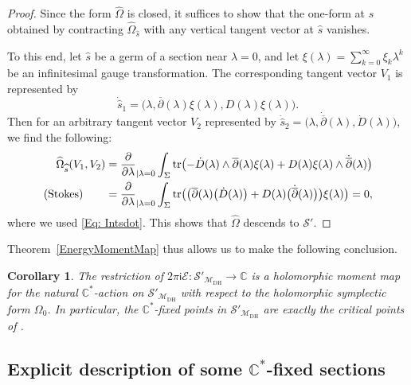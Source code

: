 \documentclass[pdftex]{sigma}
\numberwithin{equation}{section}
\newtheorem{Corollary}[Theorem]{Corollary}
\theoremstyle{definition}
\newcommand\C{{\mathbb C}}
\renewcommand{\i}{\mathsf{i}}
\begin{document}
\begin{proof}
Since the form $\widehat{\Omega}$ is closed, it suffices to show that the one-form at $\widehat s$ obtained by
contracting $\widehat{\Omega}_{\widehat{s}}$ with any vertical tangent vector at $\widehat{s}$ vanishes.

To this end, let $\widehat{s}$ be a germ of a section near $\lambda = 0$, and
let $\xi(\lambda) = \sum_{k=0}^\infty\xi_k\lambda^k$ be an infinitesimal gauge transformation.
The corresponding tangent vector $V_1$ is represented by
\[\dot{\widehat{s}}_1 = \bigl(\lambda, {\overline{\partial}}(\lambda)\xi(\lambda), D(\lambda)\xi(\lambda)\bigr).\]
Then for an arbitrary tangent vector $V_2$ represented by $\dot{\widehat{s}}_2 =
\bigl(\lambda, \dot{\overline{\partial}}(\lambda), \dot D(\lambda)\bigr)$, we find the following:
\begin{align*}
\widehat{\Omega}_{\widehat{s}}(V_1, V_2) & = \frac{\partial}{\partial \lambda}_{|\lambda = 0} \int_\Sigma\operatorname{tr}\bigl(-\dot D(\lambda)\wedge {\overline{\partial}}(\lambda)\xi(\lambda) + D(\lambda)\xi(\lambda)\wedge\dot{\overline{\partial}}(\lambda)\bigr) \\
\text{(Stokes)\qquad} & = \frac{\partial}{\partial \lambda}_{|\lambda = 0} \int_\Sigma\operatorname{tr}\bigl(\bigl({\overline{\partial}}(\lambda)\bigl(\dot D(\lambda)\bigr) + D(\lambda)\bigl(\dot{\overline{\partial}}(\lambda)\bigr)\bigr)\xi(\lambda)\bigr) = 0,
\end{align*}
where we used \eqref{Eq: Intsdot}.
This shows that $\widehat{\Omega}$ descends to $\mathcal S'$.
\end{proof}

Theorem~\ref{EnergyMomentMap} thus allows us to make the following conclusion.

\begin{Corollary}\label{cor:EnergyMDHC*}
The restriction of $2\pi \i\mathcal E\colon \mathcal S'_{\mathcal{M}_{\mathrm{DH}}}
\longrightarrow \C$ is a holomorphic moment map for the natural $\C^*$-action on $\mathcal S'_{\mathcal{M}_{\mathrm{DH}}}$ with
respect to the holomorphic symplectic form $\Omega_0$. In particular, the
$\C^*$-fixed points in $\mathcal S'_{\mathcal{M}_{\mathrm{DH}}}$ are exactly the critical points of .
\end{Corollary}

\subsection[Explicit description of some C\^{}*-fixed sections]{Explicit description of some $\boldsymbol{\C^*}$-fixed sections}\label{ss:explicitC*}
\end{document}
